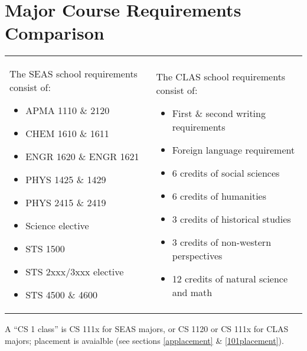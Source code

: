 \documentclass[10pt,letter]{book}
\newenvironment{itemlist}{
\begin{itemize}
\setlength{\itemsep}{0pt}
\setlength{\parskip}{0pt}}
{\end{itemize}}
\newcommand{\mysection}[1]{\section{#1}\renewcommand{\rightmark}{#1}}
\begin{document}

\clearpage

\mysection{Major Course Requirements Comparison}

\begin{figure}[h!]
\begin{center}
\end{center}
\end{figure}

\noindent
\begin{tabular}{p{2in}p{2.25in}}

The SEAS school requirements consist of:
\begin{itemlist}
\item APMA 1110 \& 2120
\item CHEM 1610 \& 1611
\item ENGR 1620 \& ENGR 1621
\item PHYS 1425 \& 1429
\item PHYS 2415 \& 2419
\item Science elective
\item STS 1500
\item STS 2xxx/3xxx elective
\item STS 4500 \& 4600
\end{itemlist}

&

The CLAS school requirements consist of:
\begin{itemlist}
\item First \& second writing requirements
\item Foreign language requirement
\item 6 credits of social sciences
\item 6 credits of humanities
\item 3 credits of historical studies
\item 3 credits of non-western perspectives
\item 12 credits of natural science and math
\end{itemlist}

\end{tabular}

\noindent A ``CS 1 class'' is CS 111x for SEAS majors, or CS 1120 or
CS 111x for CLAS majors; placement is avaialble (see sections
\ref{applacement} \& \ref{101placement}).
\end{document}
